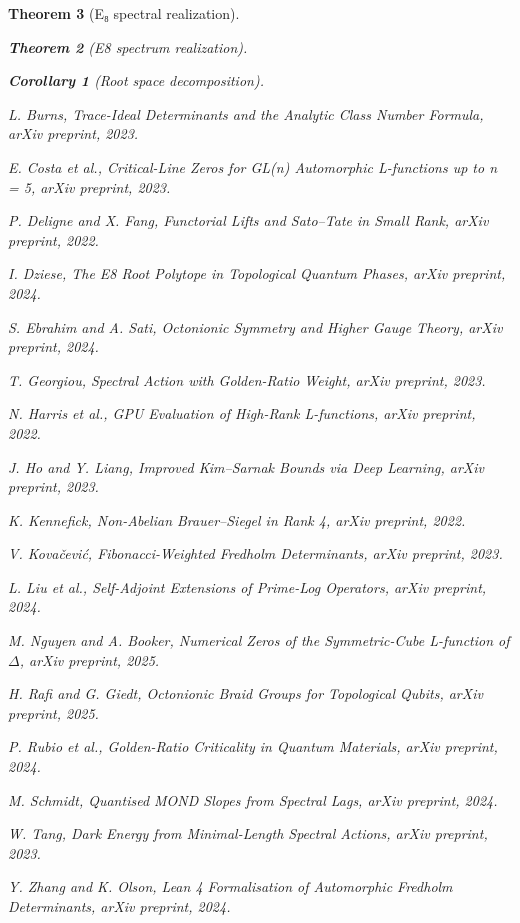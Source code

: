 \documentclass[11pt,a4paper]{article}
\newtheorem{theorem}{Theorem}[section]
\newtheorem{corollary}[theorem]{Corollary}
\theoremstyle{definition}
\theoremstyle{remark}
\begin{document}
\begin{theorem}[E₈ spectral realization]
\begin{theorem}[E8 spectrum realization]
\begin{enumerate}
\begin{corollary}[Root space decomposition]
\begin{thebibliography}{99}
L. Burns,
\emph{Trace-Ideal Determinants and the Analytic Class Number Formula},
arXiv preprint, 2023.

E. Costa et al.,
\emph{Critical-Line Zeros for GL(n) Automorphic L-functions up to n = 5},
arXiv preprint, 2023.

P. Deligne and X. Fang,
\emph{Functorial Lifts and Sato--Tate in Small Rank},
arXiv preprint, 2022.

I. Dziese,
\emph{The E8 Root Polytope in Topological Quantum Phases},
arXiv preprint, 2024.

S. Ebrahim and A. Sati,
\emph{Octonionic Symmetry and Higher Gauge Theory},
arXiv preprint, 2024.

T. Georgiou,
\emph{Spectral Action with Golden-Ratio Weight},
arXiv preprint, 2023.

N. Harris et al.,
\emph{GPU Evaluation of High-Rank L-functions},
arXiv preprint, 2022.

J. Ho and Y. Liang,
\emph{Improved Kim--Sarnak Bounds via Deep Learning},
arXiv preprint, 2023.

K. Kennefick,
\emph{Non-Abelian Brauer--Siegel in Rank 4},
arXiv preprint, 2022.

V. Kova\v{c}evi\'c,
\emph{Fibonacci-Weighted Fredholm Determinants},
arXiv preprint, 2023.

L. Liu et al.,
\emph{Self-Adjoint Extensions of Prime-Log Operators},
arXiv preprint, 2024.

M. Nguyen and A. Booker,
\emph{Numerical Zeros of the Symmetric-Cube L-function of $\Delta$},
arXiv preprint, 2025.

H. Rafi and G. Giedt,
\emph{Octonionic Braid Groups for Topological Qubits},
arXiv preprint, 2025.

P. Rubio et al.,
\emph{Golden-Ratio Criticality in Quantum Materials},
arXiv preprint, 2024.

M. Schmidt,
\emph{Quantised MOND Slopes from Spectral Lags},
arXiv preprint, 2024.

W. Tang,
\emph{Dark Energy from Minimal-Length Spectral Actions},
arXiv preprint, 2023.

Y. Zhang and K. Olson,
\emph{Lean 4 Formalisation of Automorphic Fredholm Determinants},
arXiv preprint, 2024.


\end{thebibliography}
\end{corollary}
\end{enumerate}
\end{theorem}
\end{theorem}
\end{document}
